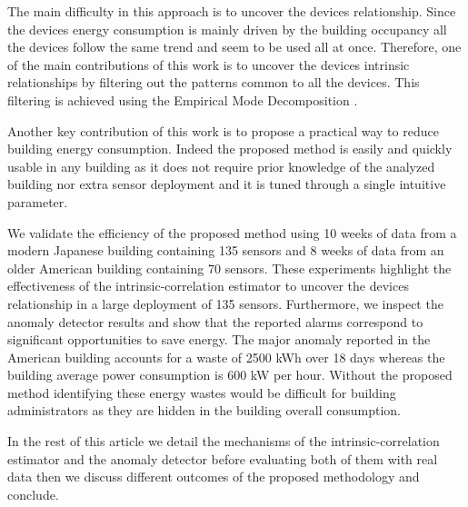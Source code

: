 The main difficulty in this approach is to uncover the devices relationship. 
Since the devices energy consumption is mainly driven by the building occupancy all the devices follow the same trend and seem to be used all at once.
Therefore, one of the main contributions of this work is to uncover the devices intrinsic relationships by filtering out the patterns common to all the devices.
This filtering is achieved using the Empirical Mode Decomposition \cite{huang:emd1998}.

Another key contribution of this work is to propose a practical way to reduce building energy consumption.
Indeed the proposed method is easily and quickly usable in any building as it does not require prior knowledge of the analyzed building nor extra sensor deployment and it is tuned through a single intuitive parameter.

We validate the efficiency of the proposed method using 10 weeks of data from a modern Japanese building containing 135 sensors and 8 weeks of data from an older American building containing 70 sensors.
These experiments highlight the effectiveness of the intrinsic-correlation estimator to uncover the devices relationship in a large deployment of 135 sensors.
Furthermore, we inspect the anomaly detector results and show that the reported alarms correspond to significant opportunities to save energy.
The major anomaly reported in the American building accounts for a waste of 2500 kWh over 18 days whereas the building average power consumption is 600 kW per hour.
Without the proposed method identifying these energy wastes would be difficult for building administrators as they are hidden in the building overall consumption.

In the rest of this article we detail the mechanisms of the intrinsic-correlation estimator and the anomaly detector before evaluating both of them with real data then we discuss different outcomes of the proposed methodology and conclude.
